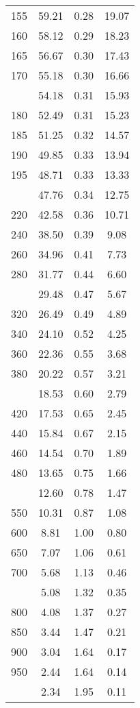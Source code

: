 \begin{table}[ht]
\begin{tabular}{lccc}
  155 & 59.21 & 0.28 & 19.07 \\ 
  160 & 58.12 & 0.29 & 18.23 \\ 
  165 & 56.67 & 0.30 & 17.43 \\ 
  170 & 55.18 & 0.30 & 16.66 \\ 
   \addlinespace
175 & 54.18 & 0.31 & 15.93 \\ 
  180 & 52.49 & 0.31 & 15.23 \\ 
  185 & 51.25 & 0.32 & 14.57 \\ 
  190 & 49.85 & 0.33 & 13.94 \\ 
  195 & 48.71 & 0.33 & 13.33 \\ 
   \addlinespace
200 & 47.76 & 0.34 & 12.75 \\ 
  220 & 42.58 & 0.36 & 10.71 \\ 
  240 & 38.50 & 0.39 & 9.08 \\ 
  260 & 34.96 & 0.41 & 7.73 \\ 
  280 & 31.77 & 0.44 & 6.60 \\ 
   \addlinespace
300 & 29.48 & 0.47 & 5.67 \\ 
  320 & 26.49 & 0.49 & 4.89 \\ 
  340 & 24.10 & 0.52 & 4.25 \\ 
  360 & 22.36 & 0.55 & 3.68 \\ 
  380 & 20.22 & 0.57 & 3.21 \\ 
   \addlinespace
400 & 18.53 & 0.60 & 2.79 \\ 
  420 & 17.53 & 0.65 & 2.45 \\ 
  440 & 15.84 & 0.67 & 2.15 \\ 
  460 & 14.54 & 0.70 & 1.89 \\ 
  480 & 13.65 & 0.75 & 1.66 \\ 
   \addlinespace
500 & 12.60 & 0.78 & 1.47 \\ 
  550 & 10.31 & 0.87 & 1.08 \\ 
  600 & 8.81 & 1.00 & 0.80 \\ 
  650 & 7.07 & 1.06 & 0.61 \\ 
  700 & 5.68 & 1.13 & 0.46 \\ 
   \addlinespace
750 & 5.08 & 1.32 & 0.35 \\ 
  800 & 4.08 & 1.37 & 0.27 \\ 
  850 & 3.44 & 1.47 & 0.21 \\ 
  900 & 3.04 & 1.64 & 0.17 \\ 
  950 & 2.44 & 1.64 & 0.14 \\ 
   \addlinespace
1000 & 2.34 & 1.95 & 0.11 \\ 
   \bottomrule
\end{tabular}
\end{table}
